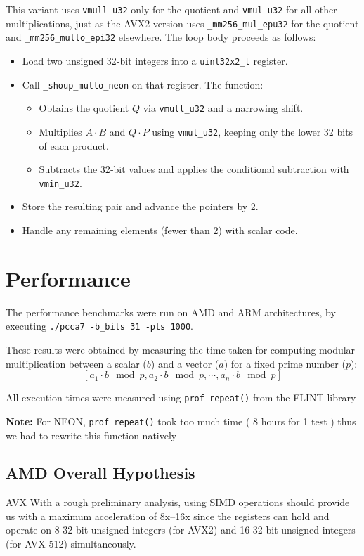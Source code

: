 \documentclass{article}
\newcommand{\pointlabel}[1]{\par\smallskip\noindent\textbf{\textcolor{accentorange}{#1:}} }
\begin{document}
This variant uses \texttt{vmull\_u32} only for the quotient and \texttt{vmul\_u32} for all other multiplications, just as the AVX2 version uses \texttt{\_mm256\_mul\_epu32} for the quotient and \texttt{\_mm256\_mullo\_epi32} elsewhere. The loop body proceeds as follows:
\begin{itemize}
    \item Load two unsigned 32‑bit integers into a \texttt{uint32x2\_t} register.
    \item Call \texttt{\_shoup\_mullo\_neon} on that register.  The function:
          \begin{itemize}
              \item Obtains the quotient \(Q\) via \texttt{vmull\_u32} and a narrowing
                    shift.
              \item Multiplies \(A \cdot B\) and \(Q \cdot P\) using \texttt{vmul\_u32},
                    keeping only the lower 32 bits of each product.
              \item Subtracts the 32‑bit values and applies the conditional subtraction
                    with \texttt{vmin\_u32}.
          \end{itemize}
    \item Store the resulting pair and advance the pointers by 2.
    \item Handle any remaining elements (fewer than 2) with scalar code.
\end{itemize}


\section{Performance}
The performance benchmarks were run on AMD and ARM architectures, by executing \texttt{./pcca7 -b\_bits 31 -pts 1000}.

These results were obtained by measuring the time taken for computing modular multiplication between a scalar ($b$) and a vector ($a$) for a fixed prime number ($p$):
\[[a_{1} \cdot b \mod p, a_{2} \cdot b \mod p, \cdots, a_{n} \cdot b \mod p ]\]

All execution times were measured using \texttt{prof\_repeat()} from the FLINT library \cite{flint}

\pointlabel{Note} For NEON, \texttt{prof\_repeat()} took too much time ( 8 hours for 1 test ) thus we had to rewrite this function natively

\subsection{AMD Overall Hypothesis}
AVX
With a rough preliminary analysis, using SIMD operations should provide us with a maximum acceleration of 8x--16x since the registers can hold and operate on 8 32-bit unsigned integers (for AVX2) and 16 32-bit unsigned integers (for AVX-512) simultaneously.
\end{document}
